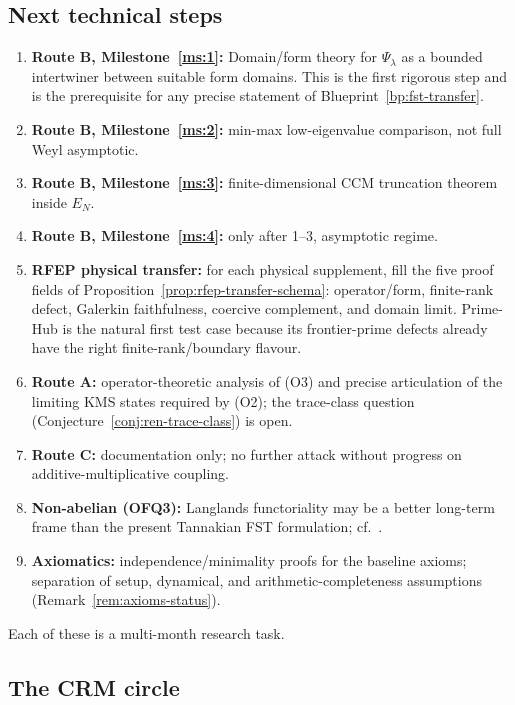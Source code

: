 \documentclass[11pt,a4paper]{article}
\theoremstyle{plain}
\theoremstyle{definition}
\begin{document}
\subsection{Next technical steps}

\begin{enumerate}[leftmargin=*]
\item \textbf{Route B, Milestone~\ref{ms:1}:} Domain/form theory for
  $\Psi_\lambda$ as a bounded intertwiner between suitable form
  domains.  This is the first rigorous step and is the prerequisite
  for any precise statement of Blueprint~\ref{bp:fst-transfer}.
\item \textbf{Route B, Milestone~\ref{ms:2}:} min-max low-eigenvalue
  comparison, not full Weyl asymptotic.
\item \textbf{Route B, Milestone~\ref{ms:3}:} finite-dimensional CCM
  truncation theorem inside $E_N$.
\item \textbf{Route B, Milestone~\ref{ms:4}:} only after 1--3,
  asymptotic regime.
\item \textbf{RFEP physical transfer:} for each physical supplement,
  fill the five proof fields of Proposition~\ref{prop:rfep-transfer-schema}:
  operator/form, finite-rank defect, Galerkin faithfulness, coercive
  complement, and domain limit.  Prime-Hub is the natural first test
  case because its frontier-prime defects already have the right
  finite-rank/boundary flavour.
\item \textbf{Route A:} operator-theoretic analysis of (O3) and
  precise articulation of the limiting KMS states required by (O2);
  the trace-class question
  (Conjecture~\ref{conj:ren-trace-class}) is open.
\item \textbf{Route C:} documentation only; no further attack
  without progress on additive-multiplicative coupling.
\item \textbf{Non-abelian (OFQ3):}  Langlands functoriality may be a
  better long-term frame than the present Tannakian FST formulation;
  cf.~\cite{TannakianAxioms}.
\item \textbf{Axiomatics:} independence/minimality proofs for the
  baseline axioms; separation of setup, dynamical, and
  arithmetic-completeness assumptions
  (Remark~\ref{rem:axioms-status}).
\end{enumerate}

Each of these is a multi-month research task.

\subsection{The CRM circle}
\end{document}

